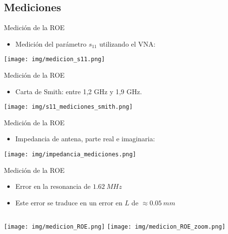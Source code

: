 \subsection{Mediciones}

\begin{frame}{Medición de la ROE}
\begin{itemize}
    \item<1-> Medición del parámetro $s_{11}$ utilizando el VNA:
\end{itemize}
    \begin{center}
        \texttt{[image: img/medicion\_s11.png]}
    \end{center}
\end{frame}

\begin{frame}{Medición de la ROE}
\begin{itemize}
    \item Carta de Smith: entre {\color{red}1,2 GHz} y {\color{green}1,9 GHz}.
\end{itemize}
\begin{center}
    \texttt{[image: img/s11\_mediciones\_smith.png]}
\end{center}
    
\end{frame}

\begin{frame}{Medición de la ROE}
 \begin{itemize}
    \item Impedancia de antena, parte real e imaginaria:
\end{itemize}
\begin{center}
    \texttt{[image: img/impedancia\_mediciones.png]}
\end{center}   
\end{frame}

\begin{frame}{Medición de la ROE}
\begin{itemize}
    \item<1-> Error en la resonancia de $1.62 \ MHz$
    \item<4-> Este error se traduce en un error en $L$ de $\approx 0.05 \ mm$
\end{itemize}

\vspace{1cm}

\begin{columns}
        \texttt{[image: img/medicion\_ROE.png]}
        \texttt{[image: img/medicion\_ROE\_zoom.png]}
\end{columns}    
\end{frame}

